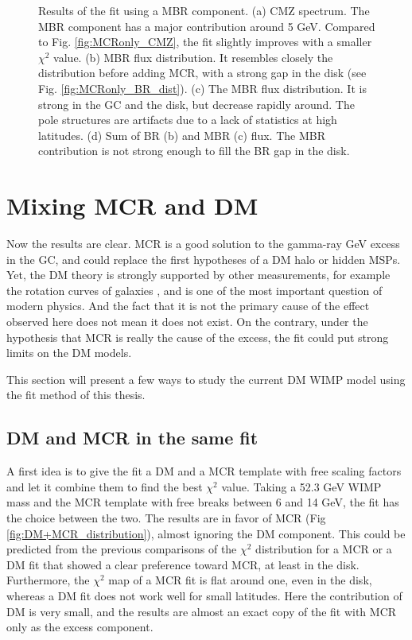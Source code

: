 \begin{figure}[b]
\begin{minipage}[h]{0.45\textwidth}
	  \subcaption{}
	  \label{}
  \end{minipage}
  \caption[Results of the fit with MBR]{Results of the fit using a MBR component. (a) CMZ spectrum. The MBR component has a major contribution around 5 GeV. Compared to Fig. \ref{fig:MCRonly_CMZ}, the fit slightly improves with a smaller $\chi^2$ value. (b) MBR flux distribution. It resembles closely the distribution before adding MCR, with a strong gap in the disk (see Fig. \ref{fig:MCRonly_BR_dist}). (c) The MBR flux distribution. It is strong in the GC and the disk, but decrease rapidly around. The pole structures are artifacts due to a lack of statistics at high latitudes. (d) Sum of BR (b) and MBR (c) flux. The MBR contribution is not strong enough to fill the BR gap in the disk.}
  \label{fig:MBR_results}	 
\end{figure}




\newpage
\section{Mixing MCR and DM}

Now the results are clear. MCR is a good solution to the gamma-ray GeV excess in the GC, and could replace the first hypotheses of a DM halo or hidden MSPs. Yet, the DM theory is strongly supported by other measurements, for example the rotation curves of galaxies  \cite{Newby2018} \cite{Rubin1971}, and is one of the most important question of modern physics. And the fact that it is not the primary cause of the effect observed here does not mean it does not exist. On the contrary, under the hypothesis that MCR is really the cause of the excess, the fit could put strong limits on the DM models.

This section will present a few ways to study the current DM WIMP model using the fit method of this thesis.


\subsection{DM and MCR in the same fit}

A first idea is to give the fit a DM and a MCR template with free scaling factors and let it combine them to find the best $\chi^2$ value. Taking a 52.3 GeV WIMP mass and the MCR template with free breaks between 6 and 14 GeV, the fit has the choice between the two. 
The results are in favor of MCR (Fig \ref{fig:DM+MCR_distribution}), almost ignoring the DM component. This could be predicted from the previous comparisons of the $\chi^2$ distribution for a MCR or a DM fit that showed a clear preference toward MCR, at least in the disk. Furthermore, the $\chi^2$ map of a MCR fit is flat around one, even in the disk, whereas a DM fit does not work well for small latitudes. Here the contribution of DM is very small, and the results are almost an exact copy of the fit with MCR only as the excess component.

